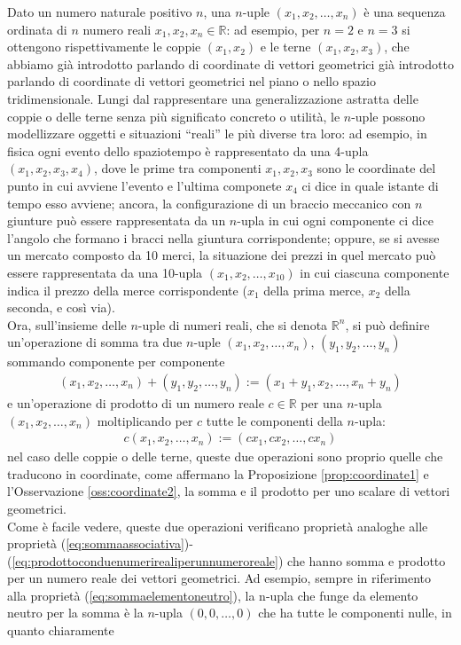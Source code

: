\documentclass{book}
\theoremstyle{definition}
\theoremstyle{plain}
\begin{document}
Dato un numero naturale positivo $n$, una $n$-uple $(x_1,x_2,\dots,x_n)$ è una sequenza ordinata di $n$ numero reali $x_1,x_2,x_n\in\mathds{R}$: ad esempio, per $n=2$ e $n=3$ si ottengono rispettivamente le coppie $(x_1,x_2)$ e le terne $(x_1,x_2,x_3)$, che abbiamo già introdotto parlando di coordinate di vettori geometrici già introdotto parlando di coordinate di vettori geometrici nel piano o nello spazio tridimensionale. Lungi dal rappresentare una generalizzazione astratta delle coppie o delle terne senza più significato concreto o utilità, le $n$-uple possono modellizzare oggetti e situazioni ``reali'' le più diverse tra loro: ad esempio, in fisica ogni evento dello spaziotempo è rappresentato da una 4-upla $(x_1,x_2,x_3,x_4)$, dove le prime tra componenti $x_1,x_2,x_3$ sono le coordinate del punto in cui avviene l'evento e l'ultima componete $x_4$ ci dice in quale istante di tempo esso avviene; ancora, la configurazione di un braccio meccanico con $n$ giunture può essere rappresentata da un $n$-upla in cui ogni componente ci dice l'angolo che formano i bracci nella giuntura corrispondente; oppure, se si avesse un mercato composto da 10 merci, la situazione dei prezzi in quel mercato può essere rappresentata da una 10-upla $(x_1,x_2,\dots,x_{10})$ in cui ciascuna componente indica il prezzo della merce corrispondente ($x_1$ della prima merce, $x_2$ della seconda, e così via).\\
Ora, sull'insieme delle $n$-uple di numeri reali, che si denota $\mathds{R}^n$, si può definire un'operazione di somma tra due $n$-uple $(x_1,x_2,\dots, x_n)$, $(y_1,y_2,\dots, y_n)$ sommando componente per componente
\begin{eqnarray}
  \label{eq:spaziovect1}
  (x_1,x_2,\dots, x_n)+(y_1,y_2,\dots, y_n):=(x_1+y_1,x_2,\dots,x_n+y_n)
\end{eqnarray}
e un'operazione di prodotto di un numero reale $c\in \mathds{R}$ per una $n$-upla $(x_1,x_2,\dots, x_n)$ moltiplicando per $c$ tutte le componenti della $n$-upla:
\begin{eqnarray}
  \label{eq:spaziovect2}
  c(x_1,x_2,\dots, x_n):=(cx_1,cx_2,\dots, cx_n)
\end{eqnarray}
nel caso delle coppie o delle terne, queste due operazioni sono proprio quelle che traducono in coordinate, come affermano la Proposizione \ref{prop:coordinate1} e l'Osservazione \ref{oss:coordinate2}, la somma e il prodotto per uno scalare di vettori geometrici.\\
Come è facile vedere, queste due operazioni verificano proprietà analoghe alle proprietà (\ref{eq:sommaassociativa})-(\ref{eq:prodottoconduenumerirealiperunnumeroreale}) che hanno somma e prodotto per un numero reale dei vettori geometrici. Ad esempio, sempre in riferimento alla proprietà (\ref{eq:sommaelementoneutro}), la n-upla che funge da elemento neutro per la somma è la $n$-upla $(0,0,\dots, 0)$ che ha tutte le componenti nulle, in quanto chiaramente
\end{document}
